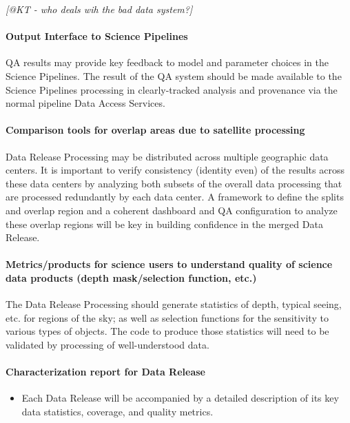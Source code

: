 \emph{[@KT - who deals wih the bad data system?]}

\paragraph{Output Interface to Science Pipelines}
\label{sec:qaOutputInterfaceSciencePipelines}

QA results may provide key feedback to model and parameter choices in the Science Pipelines.  The result of the QA system should be made available to the Science Pipelines processing in clearly-tracked analysis and provenance via the normal pipeline Data Access Services.

\paragraph{Comparison tools for overlap areas due to satellite processing}
\label{sec:qaComparisonSatelliteDataCenters}

Data Release Processing may be distributed across multiple geographic data centers.  It is important to verify consistency (identity even) of the results across these data centers by analyzing both subsets of the overall data processing that are processed redundantly by each data center. A framework to define the splits and overlap region and a coherent dashboard and QA configuration to analyze these overlap regions will be key in building confidence in the merged Data Release.

\paragraph{Metrics/products for science users to understand quality of science data products (depth mask/selection function, etc.)}
\label{sec:qaScienceUsersMetrics}

The Data Release Processing should generate statistics of depth, typical seeing, etc. for regions of the sky; as well as selection functions for the sensitivity to various types of objects.  The code to produce those statistics will need to be validated by processing of well-understood data.

\paragraph{Characterization report for Data Release}
\label{sec:qaCharacterizationReportDrp}
\begin{itemize}
\item Each Data Release will be accompanied by a detailed description of its key data statistics, coverage, and quality metrics.
\end{itemize}

